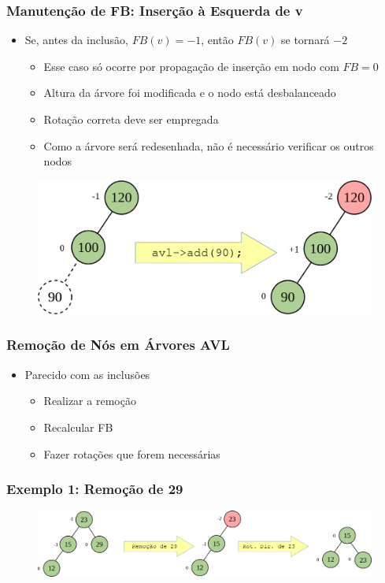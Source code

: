 \documentclass[aspectratio=169]{beamer}
\begin{document}
\begin{frame}\frametitle{Manutenção de FB: Inserção à Esquerda de v}
\begin{itemize}
	\item Se, antes da inclusão, $FB(v) = -1$, então $FB(v)$ se tornará $-2$
	\begin{itemize}
		\item Esse caso só ocorre por propagação de inserção em nodo com $FB = 0$
		\item Altura da árvore foi modificada e o nodo está desbalanceado
		\item Rotação correta deve ser empregada
		\item Como a árvore será redesenhada, não é necessário verificar os outros nodos
	\end{itemize}
\end{itemize}
\begin{figure}[h]
	\centering
	\includegraphics[height=0.35\paperheight]{imagens/avl_ins_esq3.png}
\end{figure}
\end{frame}

\begin{frame}\frametitle{Remoção de Nós em Árvores AVL}
\begin{itemize}
	\item Parecido com as inclusões
	\begin{itemize}
		\item Realizar a remoção
		\item Recalcular FB	
		\item Fazer rotações que forem necessárias
	\end{itemize}
\end{itemize}
\end{frame}

\begin{frame}\frametitle{Exemplo 1: Remoção de 29}
\begin{figure}[h]
	\centering
	\includegraphics[height=0.30\paperheight]{imagens/avl_rem_29.png}
\end{figure}
\end{frame}
\end{document}
